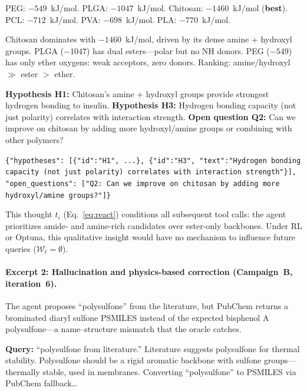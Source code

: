 \documentclass[twocolumn]{fairmeta}
\begin{document}
\begin{toolcall}
\scriptsize
PEG: $-549$~kJ/mol. PLGA: $-1047$~kJ/mol. Chitosan: $-1460$~kJ/mol (\textbf{best}).
PCL: $-712$~kJ/mol. PVA: $-698$~kJ/mol. PLA: $-770$~kJ/mol.
\end{toolcall}

\begin{agentthought}
\scriptsize
Chitosan dominates with $-1460$~kJ/mol, driven by its dense amine + hydroxyl groups.
PLGA ($-1047$) has dual esters---polar but no NH donors. PEG ($-549$) has only ether oxygens: weak acceptors, zero donors.
Ranking: amine/hydroxyl $\gg$ ester $>$ ether.

\textbf{Hypothesis H1:} Chitosan's amine + hydroxyl groups provide strongest hydrogen bonding to insulin.
\textbf{Hypothesis H3:} Hydrogen bonding capacity (not just polarity) correlates with interaction strength.
\textbf{Open question Q2:} Can we improve on chitosan by adding more hydroxyl/amine groups or combining with other polymers?
\end{agentthought}

\begin{toolcall}
\scriptsize
\texttt{\{"hypotheses": [\{"id":"H1", ...\}, \{"id":"H3", "text":"Hydrogen bonding capacity (not just polarity) correlates with interaction strength"\}], "open\_questions": ["Q2: Can we improve on chitosan by adding more hydroxyl/amine groups?"]\}}
\end{toolcall}

\noindent This thought $t_i$ (Eq.~\ref{eq:react}) conditions all subsequent tool calls: the agent prioritizes amide- and amine-rich candidates over ester-only backbones.
Under RL or Optuna, this qualitative insight would have no mechanism to influence future queries ($\mathcal{W}_t = \emptyset$).

\paragraph{Excerpt 2: Hallucination and physics-based correction (Campaign~B, iteration~6).}
The agent proposes ``polysulfone'' from the literature, but PubChem returns a brominated diaryl sulfone PSMILES instead of the expected bisphenol A polysulfone---a name--structure mismatch that the oracle catches.

\begin{agentthought}
\scriptsize
\textbf{Query:} ``polysulfone from literature.''
Literature suggests polysulfone for thermal stability.
Polysulfone should be a rigid aromatic backbone with sulfone groups---thermally stable, used in membranes.
Converting ``polysulfone'' to PSMILES via PubChem fallback\ldots
\end{agentthought}
\end{document}
